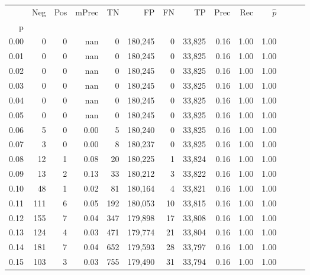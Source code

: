 \begin{tabular}{rrrrrrrrrrrrrr}
\toprule
{} &    Neg &    Pos & mPrec &       TN &       FP &      FN &      TP &  Prec &   Rec & $\hat{p}$ \\
p    &        &        &       &          &          &         &         &       &       &           \\
\midrule
0.00 &      0 &      0 &   nan &        0 &  180,245 &       0 &  33,825 &  0.16 &  1.00 &      1.00 \\
0.01 &      0 &      0 &   nan &        0 &  180,245 &       0 &  33,825 &  0.16 &  1.00 &      1.00 \\
0.02 &      0 &      0 &   nan &        0 &  180,245 &       0 &  33,825 &  0.16 &  1.00 &      1.00 \\
0.03 &      0 &      0 &   nan &        0 &  180,245 &       0 &  33,825 &  0.16 &  1.00 &      1.00 \\
0.04 &      0 &      0 &   nan &        0 &  180,245 &       0 &  33,825 &  0.16 &  1.00 &      1.00 \\
0.05 &      0 &      0 &   nan &        0 &  180,245 &       0 &  33,825 &  0.16 &  1.00 &      1.00 \\
0.06 &      5 &      0 &  0.00 &        5 &  180,240 &       0 &  33,825 &  0.16 &  1.00 &      1.00 \\
0.07 &      3 &      0 &  0.00 &        8 &  180,237 &       0 &  33,825 &  0.16 &  1.00 &      1.00 \\
0.08 &     12 &      1 &  0.08 &       20 &  180,225 &       1 &  33,824 &  0.16 &  1.00 &      1.00 \\
0.09 &     13 &      2 &  0.13 &       33 &  180,212 &       3 &  33,822 &  0.16 &  1.00 &      1.00 \\
0.10 &     48 &      1 &  0.02 &       81 &  180,164 &       4 &  33,821 &  0.16 &  1.00 &      1.00 \\
0.11 &    111 &      6 &  0.05 &      192 &  180,053 &      10 &  33,815 &  0.16 &  1.00 &      1.00 \\
0.12 &    155 &      7 &  0.04 &      347 &  179,898 &      17 &  33,808 &  0.16 &  1.00 &      1.00 \\
0.13 &    124 &      4 &  0.03 &      471 &  179,774 &      21 &  33,804 &  0.16 &  1.00 &      1.00 \\
0.14 &    181 &      7 &  0.04 &      652 &  179,593 &      28 &  33,797 &  0.16 &  1.00 &      1.00 \\
0.15 &    103 &      3 &  0.03 &      755 &  179,490 &      31 &  33,794 &  0.16 &  1.00 &      1.00 \\

\end{tabular}

